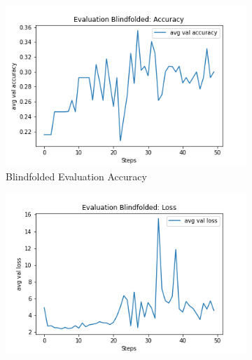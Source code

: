 \begin{figure}[ht!]
     \centering
     \begin{subfigure}[b]{0.3\textwidth}
         \centering
         \includegraphics[width=\textwidth]{./figure/results/baseline_and_blindfolding/blindfolded/avg val accuracy.png}
         \caption{Blindfolded Evaluation Accuracy}
         \label{fig:blindfolded_accuracy}
     \end{subfigure}
     \hfill
     \begin{subfigure}[b]{0.3\textwidth}
         \centering
         \includegraphics[width=\textwidth]{./figure/results/baseline_and_blindfolding/blindfolded/avg val loss.png}

\end{subfigure}
\end{figure}

